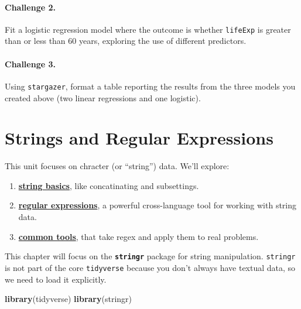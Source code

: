 \documentclass[]{book}
\newenvironment{Shaded}{\begin{snugshade}}{\end{snugshade}}
\newcommand{\KeywordTok}[1]{\textcolor[rgb]{0.13,0.29,0.53}{\textbf{#1}}}
\newcommand{\NormalTok}[1]{#1}
\providecommand{\tightlist}{%
  \setlength{\itemsep}{0pt}\setlength{\parskip}{0pt}}
\begin{document}
\hypertarget{challenge-2.-10}{%
\subsubsection*{Challenge 2.}\label{challenge-2.-10}}

Fit a logistic regression model where the outcome is whether \texttt{lifeExp} is greater than or less than 60 years, exploring the use of different predictors.

\hypertarget{challenge-3.-7}{%
\subsubsection*{Challenge 3.}\label{challenge-3.-7}}

Using \texttt{stargazer}, format a table reporting the results from the three models you created above (two linear regressions and one logistic).

\hypertarget{strings-and-regular-expressions}{%
\chapter{Strings and Regular Expressions}\label{strings-and-regular-expressions}}

This unit focuses on chracter (or ``string'') data. We'll explore:

\begin{enumerate}
\def\labelenumi{\arabic{enumi}.}
\tightlist
\item
  \textbf{\protect\hyperlink{string-basics}{string basics}}, like concatinating and subsettings.
\item
  \textbf{\protect\hyperlink{regular-expressions}{regular expressions}}, a powerful cross-language tool for working with string data.
\item
  \textbf{\protect\hyperlink{common-tools}{common tools}}, that take regex and apply them to real problems.
\end{enumerate}

This chapter will focus on the \textbf{\texttt{stringr}} package for string manipulation. \texttt{stringr} is not part of the core \texttt{tidyverse} because you don't always have textual data, so we need to load it explicitly.

\begin{Shaded}
\begin{Highlighting}[]
\KeywordTok{library}\NormalTok{(tidyverse)}
\KeywordTok{library}\NormalTok{(stringr)}
\end{Highlighting}
\end{Shaded}
\end{document}
